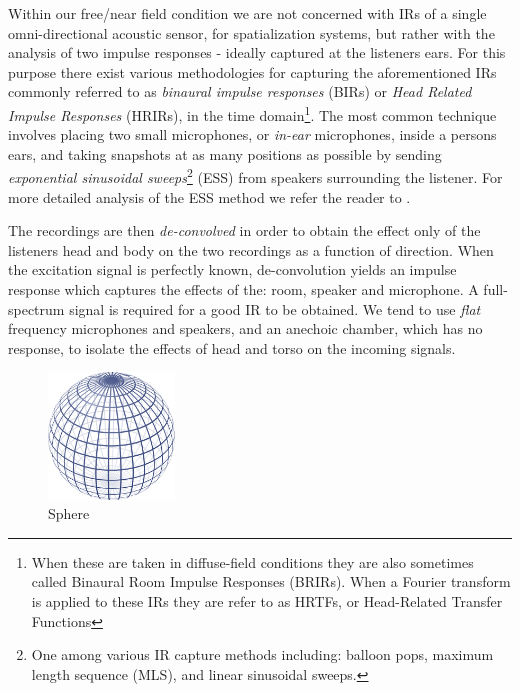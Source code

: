 Within our free/near field condition we are not concerned with IRs of a single omni-directional acoustic sensor, for spatialization systems, but rather with the analysis of two impulse responses - ideally captured at the listeners ears. For this purpose there exist various methodologies for capturing the aforementioned IRs commonly referred to as \textit{binaural impulse responses} (BIRs) or \textit{Head Related Impulse Responses} (HRIRs), in the time domain\footnote{When these are taken in diffuse-field conditions they are also sometimes called Binaural Room Impulse Responses (BRIRs). When a Fourier transform is applied to these IRs they are refer to as HRTFs, or Head-Related Transfer Functions}. The most common technique involves placing two small microphones, or \textit{in-ear} microphones, inside a persons ears, and taking snapshots at as many positions as possible by sending \textit{exponential sinusoidal sweeps}\footnote{One among various IR capture methods including: balloon pops, maximum length sequence (MLS), and linear sinusoidal sweeps.} (ESS) from speakers surrounding the listener. For more detailed analysis of the ESS method we refer the reader to \cite{farina2007advancements}.

The recordings are then \textit{de-convolved} in order to obtain the effect only of the listeners head and body on the two recordings as a function of direction. When the excitation signal is perfectly known, de-convolution yields an impulse response which captures the effects of the: room, speaker and microphone. A full-spectrum signal is required for a good IR to be obtained. We tend to use \textit{flat} frequency microphones and speakers, and an anechoic chamber, which has no response, to isolate the effects of head and torso on the incoming signals. 

\begin{figure}[ht!]%
\centering
\includegraphics[width=0.3\textwidth]{img/sphere-png.png} 
\caption{Sphere \cite{Spherewi43:online}}
\label{fig:sphere}
\end{figure}

